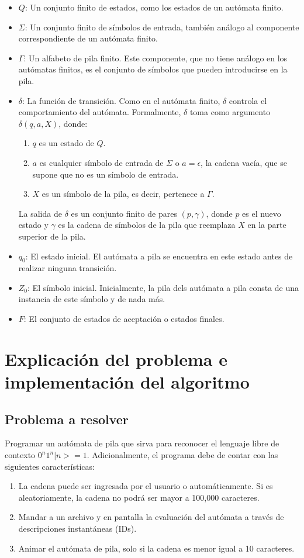 \documentclass{article}
\begin{document}
\begin{itemize}
    \item $Q$: Un conjunto finito de estados, como los estados de un autómata finito.
    \item $\Sigma$: Un conjunto finito de símbolos de entrada, también análogo al componente correspondiente de un autómata finito.
    \item $\Gamma$: Un alfabeto de pila finito. Este componente, que no tiene análogo en los autómatas finitos, es el conjunto de símbolos que pueden introducirse en la pila.
    \item $\delta$: La función de transición. Como en el autómata finito, $\delta$ controla el comportamiento del autómata. Formalmente, $\delta$ toma como argumento $\delta(q,a,X)$, donde:
    \begin{enumerate}
        \item $q$ es un estado de $Q$.
        \item $a$ es cualquier símbolo de entrada de $\Sigma$ o $a=\epsilon$, la cadena vacía, que se supone que no es un símbolo de entrada.
        \item $X$ es un símbolo de la pila, es decir, pertenece a $\Gamma$.
    \end{enumerate}
    La salida de $\delta$ es un conjunto finito de pares $(p,\gamma)$, donde $p$ es el nuevo estado y $\gamma$ es la cadena de símbolos de la pila que reemplaza $X$ en la parte superior de la pila.
    \item $q_0$: El estado inicial. El autómata a pila se encuentra en este estado antes de realizar ninguna transición.
    \item $Z_0$: El símbolo inicial. Inicialmente, la pila dels autómata a pila consta de una instancia de este símbolo y de nada más.
    \item $F$: El conjunto de estados de aceptación o estados finales.
\end{itemize}

\section{Explicaci\'on del problema e implementaci\'on del algoritmo}
\subsection{Problema a resolver}
Programar un autómata de pila que sirva para reconocer el lenguaje libre de contexto ${0^n 1^n | n >= 1}$.\newline 
\newline
Adicionalmente, el programa debe de contar con las siguientes características:
\begin{enumerate}
    \item La cadena puede ser ingresada por el usuario o automáticamente. Si es aleatoriamente, la cadena no podrá ser mayor a 100,000 caracteres.
    \item Mandar a un archivo y en pantalla la evaluación del autómata a través de descripciones instantáneas (IDs).
    \item Animar el autómata de pila, solo si la cadena es menor igual a 10 caracteres.
\end{enumerate}
\end{document}
